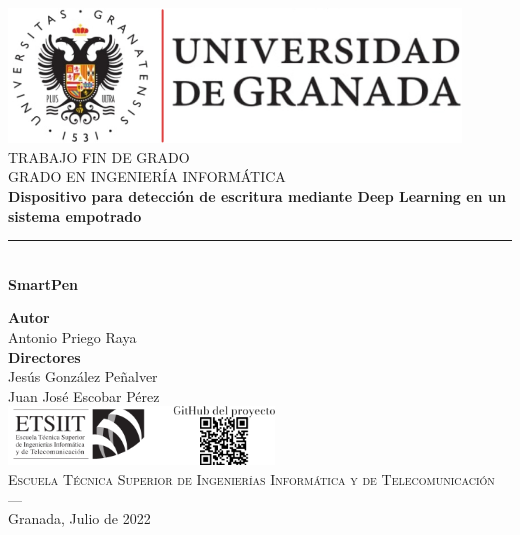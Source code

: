 \begin{titlepage}
 
 
\newlength{\centeroffset}
\setlength{\centeroffset}{-0.5\oddsidemargin}
\addtolength{\centeroffset}{0.5\evensidemargin}
\thispagestyle{empty}

\noindent\hspace*{\centeroffset}\begin{minipage}{\textwidth}

\centering
\includegraphics[width=0.9\textwidth]{imagenes/logo_ugr_mod.jpg}\\[1.4cm]

\textsc{ \Large TRABAJO FIN DE GRADO\\[0.2cm]}
\textsc{ GRADO EN INGENIERÍA INFORMÁTICA}\\[1cm]
% 
{\Huge\bfseries Dispositivo para detección de escritura mediante Deep Learning en
un sistema empotrado\\
}
\noindent\rule[-1ex]{\textwidth}{3pt}\\[3.5ex]
{\large\bfseries SmartPen}
\end{minipage}

\vspace{1.1cm}
\noindent\hspace*{\centeroffset}\begin{minipage}{\textwidth}
\centering

\textbf{Autor}\\ {Antonio Priego Raya}\\[2ex]
\textbf{Directores}\\
{Jesús González Peñalver\\
Juan José Escobar Pérez}\\[1.0cm]

\includegraphics[width=0.53\textwidth]{imagenes/etsiit_logo_y_qr_proyecto.png}\\[0.1cm]


\textsc{Escuela Técnica Superior de Ingenierías Informática y de Telecomunicación}\\
\textsc{---}\\
Granada, Julio de 2022
\end{minipage}
\end{titlepage}


